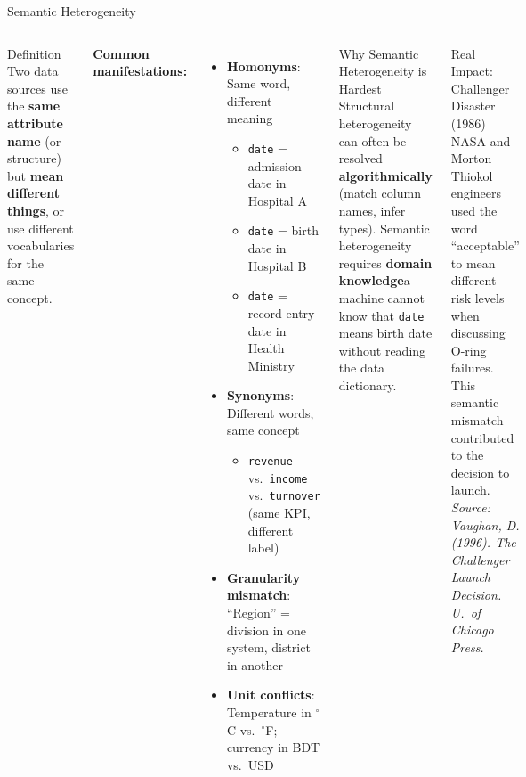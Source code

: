 \documentclass[aspectratio=169,10pt]{beamer}
\begin{document}
\begin{frame}{Semantic Heterogeneity}
  \begin{columns}[T]
      \begin{block}{Definition}
        Two data sources use the \textbf{same attribute name} (or structure) but \textbf{mean different things}, or use different vocabularies for the same concept.
      \end{block}
      \vspace{6pt}
      \textbf{Common manifestations:}
      \begin{itemize}
        \item \textbf{Homonyms}: Same word, different meaning
        \begin{itemize}
          \small
          \item \texttt{date} = admission date in Hospital A
          \item \texttt{date} = birth date in Hospital B
          \item \texttt{date} = record-entry date in Health Ministry
        \end{itemize}
        \item \textbf{Synonyms}: Different words, same concept
        \begin{itemize}
          \small
          \item \texttt{revenue} vs.\ \texttt{income} vs.\ \texttt{turnover} (same KPI, different label)
        \end{itemize}
        \item \textbf{Granularity mismatch}: ``Region'' = division in one system, district in another
        \item \textbf{Unit conflicts}: Temperature in $^\circ$C vs.\ $^\circ$F; currency in BDT vs.\ USD
      \end{itemize}

      \begin{alertblock}{Why Semantic Heterogeneity is Hardest}
        Structural heterogeneity can often be resolved \textbf{algorithmically} (match column names, infer types).  Semantic heterogeneity requires \textbf{domain knowledge}\textemdash a machine cannot know that \texttt{date} means birth date without reading the data dictionary.
      \end{alertblock}
      \vspace{6pt}
      \begin{exampleblock}{Real Impact: Challenger Disaster (1986)}
        NASA and Morton Thiokol engineers used the word ``acceptable'' to mean different risk levels when discussing O-ring failures.  This semantic mismatch contributed to the decision to launch.\\[4pt]
        \textit{Source: Vaughan, D. (1996). \textit{The Challenger Launch Decision}. U.\ of Chicago Press.}
      \end{exampleblock}
  \end{columns}
\end{frame}
\end{document}
